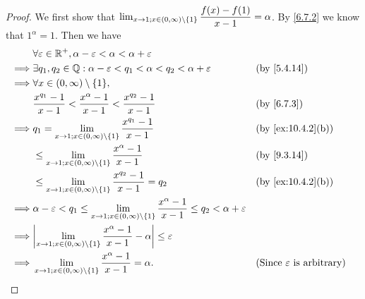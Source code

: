 \begin{proof}
  We first show that \(\lim_{x \to 1 ; x \in (0, \infty) \setminus \left\lbrace1\right\rbrace} \dfrac{f(x) - f(1)}{x - 1} = \alpha\).
  By \cref{6.7.2} we know that \(1^{\alpha} = 1\).
  Then we have
  \begin{align*}
             & \forall \varepsilon \in \R^+, \alpha - \varepsilon < \alpha < \alpha + \varepsilon                                                                                                                  \\
    \implies & \exists q_1, q_2 \in \Q : \alpha - \varepsilon < q_1 < \alpha < q_2 < \alpha + \varepsilon                                                         &  & \by{5.4.14}                                 \\
    \implies & \forall x \in (0, \infty) \setminus \set{1},                                                                                                                                                        \\
             & \dfrac{x^{q_1} - 1}{x - 1} < \dfrac{x^{\alpha} - 1}{x - 1} < \dfrac{x^{q_2} - 1}{x - 1}                                                            &  & \by{6.7.3}                                  \\
    \implies & q_1 = \lim_{x \to 1 ; x \in (0, \infty) \setminus \set{1}} \dfrac{x^{q_1} - 1}{x - 1}                                                              &  & \text{(by \cref{ex:10.4.2}(b))}             \\
             & \leq \lim_{x \to 1 ; x \in (0, \infty) \setminus \set{1}} \dfrac{x^{\alpha} - 1}{x - 1}                                                            &  & \by{9.3.14}                                 \\
             & \leq \lim_{x \to 1 ; x \in (0, \infty) \setminus \set{1}} \dfrac{x^{q_2} - 1}{x - 1} = q_2                                                         &  & \text{(by \cref{ex:10.4.2}(b))}             \\
    \implies & \alpha - \varepsilon < q_1 \leq \lim_{x \to 1 ; x \in (0, \infty) \setminus \set{1}} \dfrac{x^{\alpha} - 1}{x - 1} \leq q_2 < \alpha + \varepsilon                                                  \\
    \implies & \abs{\lim_{x \to 1 ; x \in (0, \infty) \setminus \set{1}} \dfrac{x^{\alpha} - 1}{x - 1} - \alpha} \leq \varepsilon                                                                                  \\
    \implies & \lim_{x \to 1 ; x \in (0, \infty) \setminus \set{1}} \dfrac{x^{\alpha} - 1}{x - 1} = \alpha.                                                       &  & \text{(Since \(\varepsilon\) is arbitrary)}
  \end{align*}


\end{proof}
